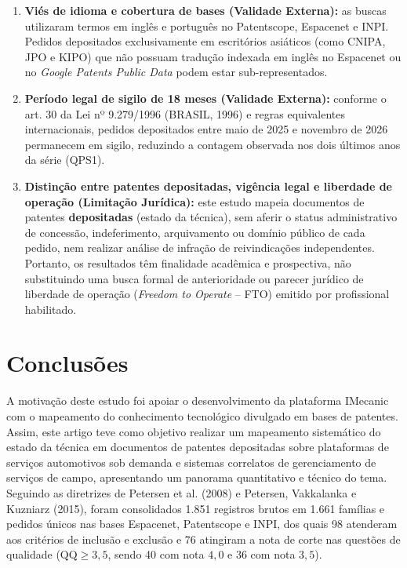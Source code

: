 \documentclass[12pt,a4paper]{article}
\begin{document}
\begin{enumerate}
    \item \textbf{Viés de idioma e cobertura de bases (Validade Externa):} as buscas utilizaram termos em inglês e português no Patentscope, Espacenet e INPI. Pedidos depositados exclusivamente em escritórios asiáticos (como CNIPA, JPO e KIPO) que não possuam tradução indexada em inglês no Espacenet ou no \textit{Google Patents Public Data} podem estar sub-representados.
    \item \textbf{Período legal de sigilo de 18 meses (Validade Externa):} conforme o art. 30 da Lei nº 9.279/1996 (BRASIL, 1996) e regras equivalentes internacionais, pedidos depositados entre maio de 2025 e novembro de 2026 permanecem em sigilo, reduzindo a contagem observada nos dois últimos anos da série (QPS1).
    \item \textbf{Distinção entre patentes depositadas, vigência legal e liberdade de operação (Limitação Jurídica):} este estudo mapeia documentos de patentes \textbf{depositadas} (estado da técnica), sem aferir o status administrativo de concessão, indeferimento, arquivamento ou domínio público de cada pedido, nem realizar análise de infração de reivindicações independentes. Portanto, os resultados têm finalidade acadêmica e prospectiva, não substituindo uma busca formal de anterioridade ou parecer jurídico de liberdade de operação (\textit{Freedom to Operate} -- FTO) emitido por profissional habilitado.
\end{enumerate}

\section{Conclusões}

A motivação deste estudo foi apoiar o desenvolvimento da plataforma IMecanic com o mapeamento do conhecimento tecnológico divulgado em bases de patentes. Assim, este artigo teve como objetivo realizar um mapeamento sistemático do estado da técnica em documentos de patentes depositadas sobre plataformas de serviços automotivos sob demanda e sistemas correlatos de gerenciamento de serviços de campo, apresentando um panorama quantitativo e técnico do tema. Seguindo as diretrizes de Petersen et al. (2008) e Petersen, Vakkalanka e Kuzniarz (2015), foram consolidados 1.851 registros brutos em 1.661 famílias e pedidos únicos nas bases Espacenet, Patentscope e INPI, dos quais 98 atenderam aos critérios de inclusão e exclusão e 76 atingiram a nota de corte nas questões de qualidade ($\text{QQ} \ge 3{,}5$, sendo 40 com nota $4{,}0$ e 36 com nota $3{,}5$).
\end{document}

